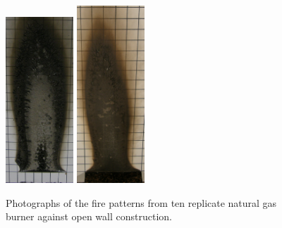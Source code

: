 \documentclass[twoside]{uocthesis}
\begin{document}
\begin{figure}[p]
	\includegraphics[width=1.0in]{../Figures/GBNG10_P5120251}
	\includegraphics[width=1.0in]{../Figures/GBNG13_P5120356} \\

	\caption[Photographs of the fire patterns from ten replicate natural gas burner against open wall construction]{Photographs of the fire patterns from ten replicate natural gas burner against open wall construction.}
	\label{NG_Open_Wall}
\end{figure}
\end{document}
